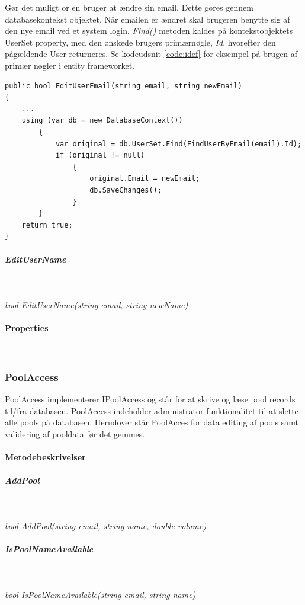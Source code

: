 Gør det muligt or en bruger at ændre sin email. Dette gøres gennem databasekontekst objektet. Når emailen er ændret skal brugeren benytte sig af den nye email ved et system login. \textit{Find()} metoden kaldes på kontekstobjektets UserSet property, med den ønskede brugers primærnøgle, \textit{Id}, hvorefter den pågældende User returneres. Se kodeudsnit \ref{code:idef} for eksempel på brugen af primær nøgler i entity frameworket.

\begin{lstlisting}[caption=EditUserEmail - brug af primær nøgler i Entity Framework,label=code:idef]
public bool EditUserEmail(string email, string newEmail)
{
	...
	using (var db = new DatabaseContext())
		{
			var original = db.UserSet.Find(FindUserByEmail(email).Id);
			if (original != null)
				{
					original.Email = newEmail;
					db.SaveChanges();
				}
		}
	return true;
}

\end{lstlisting}

\subparagraph{EditUserName}\

\textit{bool EditUserName(string email, string newName)}

\paragraph{Properties}\


\subsubsection{PoolAccess}
PoolAccess implementerer IPoolAccess og står for at skrive og læse pool records til/fra databasen. PoolAccess indeholder administrator funktionalitet til at slette alle pools på databasen. Herudover står PoolAcces for data editing af pools samt validering af pooldata før det gemmes.


\paragraph{Metodebeskrivelser}

\subparagraph{AddPool}\

\textit{bool AddPool(string email, string name, double volume)}

\subparagraph{IsPoolNameAvailable}\

\textit{bool IsPoolNameAvailable(string email, string name)}

